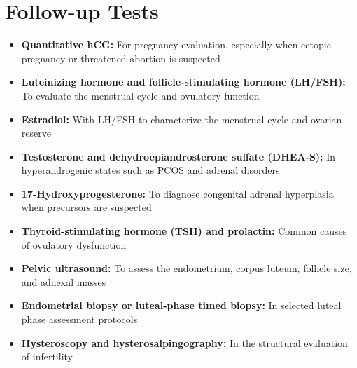 \section*{Follow-up Tests}
\begin{itemize}
  \item \textbf{Quantitative hCG:} For pregnancy evaluation, especially when ectopic pregnancy or threatened abortion is suspected
  \item \textbf{Luteinizing hormone and follicle-stimulating hormone (LH/FSH):} To evaluate the menstrual cycle and ovulatory function
  \item \textbf{Estradiol:} With LH/FSH to characterize the menstrual cycle and ovarian reserve
  \item \textbf{Testosterone and dehydroepiandrosterone sulfate (DHEA-S):} In hyperandrogenic states such as PCOS and adrenal disorders
  \item \textbf{17-Hydroxyprogesterone:} To diagnose congenital adrenal hyperplasia when precursors are suspected
  \item \textbf{Thyroid-stimulating hormone (TSH) and prolactin:} Common causes of ovulatory dysfunction
  \item \textbf{Pelvic ultrasound:} To assess the endometrium, corpus luteum, follicle size, and adnexal masses
  \item \textbf{Endometrial biopsy or luteal-phase timed biopsy:} In selected luteal phase assessment protocols
  \item \textbf{Hysteroscopy and hysterosalpingography:} In the structural evaluation of infertility
\end{itemize}

